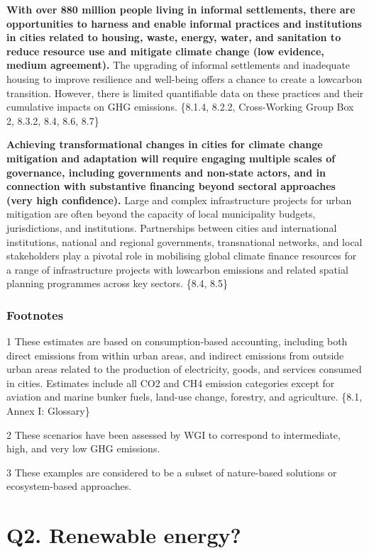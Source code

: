 \documentclass[
  letterpaper,
  DIV=11,
  numbers=noendperiod]{scrreprt}
\begin{document}
\textbf{With over 880 million people living in informal settlements,
there are opportunities to harness and enable informal practices and
institutions in cities related to housing, waste, energy, water, and
sanitation to reduce resource use and mitigate climate change (low
evidence, medium agreement).} The upgrading of informal settlements and
inadequate housing to improve resilience and well-being offers a chance
to create a lowcarbon transition. However, there is limited quantifiable
data on these practices and their cumulative impacts on GHG emissions.
\{8.1.4, 8.2.2, Cross-Working Group Box 2, 8.3.2, 8.4, 8.6, 8.7\}

\textbf{Achieving transformational changes in cities for climate change
mitigation and adaptation will require engaging multiple scales of
governance, including governments and non-state actors, and in
connection with substantive financing beyond sectoral approaches (very
high confidence).} Large and complex infrastructure projects for urban
mitigation are often beyond the capacity of local municipality budgets,
jurisdictions, and institutions. Partnerships between cities and
international institutions, national and regional governments,
transnational networks, and local stakeholders play a pivotal role in
mobilising global climate finance resources for a range of
infrastructure projects with lowcarbon emissions and related spatial
planning programmes across key sectors. \{8.4, 8.5\}

\hypertarget{footnotes}{%
\subsection{Footnotes}\label{footnotes}}

1 These estimates are based on consumption-based accounting, including
both direct emissions from within urban areas, and indirect emissions
from outside urban areas related to the production of electricity,
goods, and services consumed in cities. Estimates include all CO2 and
CH4 emission categories except for aviation and marine bunker fuels,
land-use change, forestry, and agriculture. \{8.1, Annex I: Glossary\}

2 These scenarios have been assessed by WGI to correspond to
intermediate, high, and very low GHG emissions.

3 These examples are considered to be a subset of nature-based solutions
or ecosystem-based approaches.


\hypertarget{q2.-renewable-energy}{%
\chapter{Q2. Renewable energy?}\label{q2.-renewable-energy}}
\end{document}
